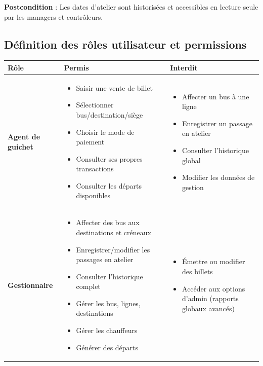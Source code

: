 \documentclass[a4paper, 12pt]{book}
\begin{document}
\textbf{Postcondition} : Les dates d'atelier sont historisées et accessibles en lecture seule par les managers et contrôleurs.

\subsection{Définition des rôles utilisateur et permissions}

\begin{table}[H]
\centering
\renewcommand{\arraystretch}{1.3}
\begin{tabular}{|l|p{6.2cm}|p{6.2cm}|}
\hline
\textbf{Rôle} & \textbf{Permis} & \textbf{Interdit} \\
\hline
\textbf{Agent de guichet} & 
\begin{itemize}
    \item Saisir une vente de billet
    \item Sélectionner bus/destination/siège
    \item Choisir le mode de paiement
    \item Consulter ses propres transactions
    \item Consulter les départs disponibles
\end{itemize} &
\begin{itemize}
    \item Affecter un bus à une ligne
    \item Enregistrer un passage en atelier
    \item Consulter l'historique global
    \item Modifier les données de gestion
\end{itemize} \\
\hline
\textbf{Gestionnaire} & 
\begin{itemize}
    \item Affecter des bus aux destinations et créneaux
    \item Enregistrer/modifier les passages en atelier
    \item Consulter l'historique complet
    \item Gérer les bus, lignes, destinations
    \item Gérer les chauffeurs
    \item Générer des départs
\end{itemize} &
\begin{itemize}
    \item Émettre ou modifier des billets
    \item Accéder aux options d'admin (rapports globaux avancés)

\end{itemize}
\end{tabular}
\end{table}
\end{document}
